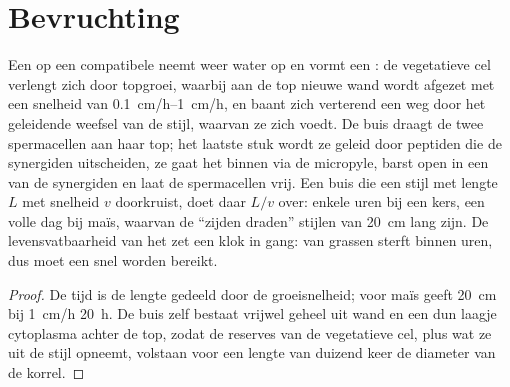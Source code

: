 \section{Bevruchting}

\begin{theorem}[De stuifmeelbuis]\label{thm:b2:angiosperm-reproduction:tube}
Een  op een compatibele  neemt weer water op en
vormt een \emph{}: de vegetatieve cel verlengt zich door
topgroei, waarbij aan de top nieuwe wand wordt afgezet met een snelheid
van \qtyrange{0.1}{1}{cm/h}, en baant zich verterend een weg door het
geleidende weefsel van de stijl, waarvan ze zich voedt. De buis draagt de
twee spermacellen aan haar top; het laatste stuk wordt ze geleid door
peptiden die de synergiden uitscheiden, ze gaat het  binnen
via de micropyle, barst open in een van de synergiden en laat de
spermacellen vrij. Een buis die een stijl met lengte $L$ met snelheid
$v$ doorkruist, doet daar $L/v$ over: enkele uren bij een kers, een volle
dag bij maïs, waarvan de ``zijden draden'' stijlen van \qty{20}{cm} lang
zijn. De levensvatbaarheid van het  zet een klok in gang:
 van grassen sterft binnen uren, dus moet een  snel
worden bereikt.
\end{theorem}
\begin{proof}
De tijd is de lengte gedeeld door de groeisnelheid; voor maïs geeft
\qty{20}{cm} bij \qty{1}{cm/h} \qty{20}{h}. De buis zelf bestaat vrijwel
geheel uit wand en een dun laagje cytoplasma achter de top, zodat de
reserves van de vegetatieve cel, plus wat ze uit de stijl opneemt,
volstaan voor een lengte van duizend keer de diameter van de korrel.
\end{proof}

